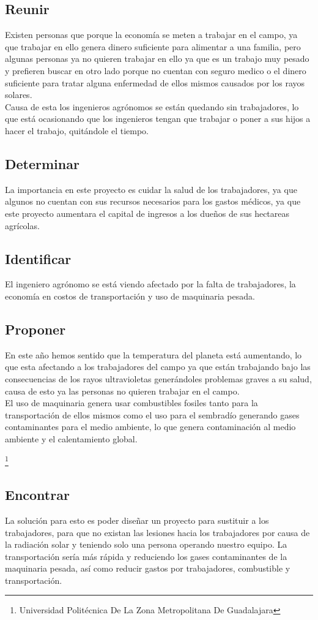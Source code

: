 \documentclass[11pt,a4paper]{article}
\begin{document}
\subsection{Reunir}
Existen personas que porque la economía se meten a trabajar en el campo, ya que trabajar en ello genera dinero suficiente para alimentar a una familia, pero algunas personas ya no quieren trabajar en ello ya que es un trabajo muy pesado y prefieren buscar en otro lado porque no cuentan con seguro medico o el dinero suficiente para tratar alguna enfermedad de ellos mismos causados por los rayos solares.\\
Causa de esta los ingenieros agrónomos se están quedando sin trabajadores, lo que está ocasionando que los ingenieros tengan que trabajar o poner a sus hijos a hacer el trabajo, quitándole el tiempo.
\subsection{Determinar}
La importancia en este proyecto es cuidar la salud de los trabajadores, ya que algunos no cuentan con sus recursos necesarios para los gastos médicos, ya que este proyecto aumentara el capital de ingresos a los dueños de sus hectareas agrícolas.
\subsection{Identificar}
El ingeniero agrónomo se está viendo afectado por la falta de trabajadores, la economía en costos de transportación y uso de maquinaria pesada.
\subsection{Proponer}
En este año hemos sentido que la temperatura del planeta está aumentando, lo que esta afectando a los trabajadores del campo ya que están trabajando bajo las consecuencias de los rayos ultravioletas generándoles problemas graves a su salud, causa de esto ya las personas no quieren trabajar en el campo.\\
El uso de maquinaria genera usar combustibles fosiles tanto para la transportación de ellos mismos como el uso para el sembradío generando gases contaminantes para el medio ambiente, lo que genera contaminación al medio ambiente y el calentamiento global.

\footnote{Universidad Politécnica De La Zona Metropolitana De Guadalajara} 

\newpage

\subsection{Encontrar}
La solución para esto es poder diseñar un proyecto para sustituir a los trabajadores, para que no existan las lesiones hacia los trabajadores por causa de la radiación solar y teniendo solo una persona operando nuestro equipo. La transportación sería más rápida y reduciendo los gases contaminantes de la maquinaria pesada, así como reducir gastos por trabajadores, combustible y transportación.
\end{document}
